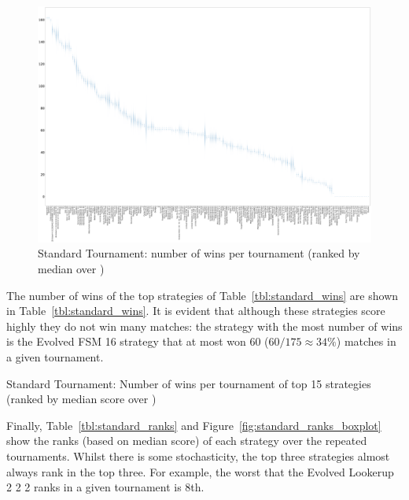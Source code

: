 \documentclass{article}
\begin{document}
\begin{landscape}
    \begin{figure}[!hbtp]
        \centering
        \includegraphics[width=\paperwidth]{./assets/standard_wins_boxplots.pdf}
        \caption{Standard Tournament: number of wins per tournament (ranked by
        median over
        \protecttournaments)}
        \label{fig:standard_winplot}
    \end{figure}
\end{landscape}

The number of wins of the top strategies of Table~\ref{tbl:standard_wins} are
shown in Table~\ref{tbl:standard_wins}. It is evident that although these
strategies score highly they do not win many matches: the strategy with the most
number of wins is the Evolved FSM 16 strategy that at most won 60
(\(60/175\approx34\%\)) matches in a given tournament.

\begin{table}[!hbtp]
    \centering
        
        \caption{Standard Tournament: Number of wins per tournament
        of top 15 strategies (ranked by median score over
        \protecttournaments)}
        \label{tbl:standard_wins}
\end{table}

Finally, Table~\ref{tbl:standard_ranks} and
Figure~\ref{fig:standard_ranks_boxplot} show the ranks (based on median score)
of each strategy over the repeated tournaments. Whilst there is some
stochasticity, the top three strategies almost always rank in the top three. For
example, the worst that the Evolved Lookerup 2 2 2 ranks in a given tournament
is 8th.
\end{document}
